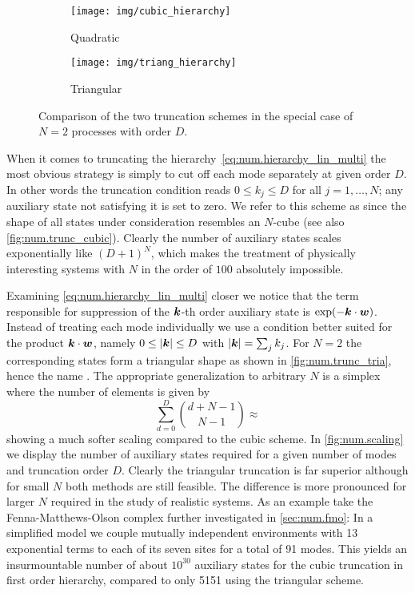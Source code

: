 \begin{figure}
  \centering
  \begin{subfigure}[b]{.4\columnwidth}
    \centering
    \texttt{[image: img/cubic\_hierarchy]}
    \caption{Quadratic}
    \label{fig:num.trunc_cubic}
  \end{subfigure}
  \begin{subfigure}[b]{.4\columnwidth}
    \centering
    \texttt{[image: img/triang\_hierarchy]}
    \caption{Triangular}
    \label{fig:num.trunc_tria}
  \end{subfigure}
  \caption{Comparison of the two truncation schemes in the special case of $N=2$ processes with order $D$.}
  \label{fig:num.trunc}
\end{figure}
When it comes to truncating the hierarchy~\ref{eq:num.hierarchy_lin_multi} the most obvious strategy is simply to cut off each mode separately at given order $D$.
In other words the truncation condition reads $0 \le k_j \le D$ for all $j=1,\dots,N$; any auxiliary state not satisfying it is set to zero.
We refer to this scheme as  since the shape of all states under consideration resembles an $N$-cube (see also \autoref{fig:num.trunc_cubic}).
Clearly the number of auxiliary states scales exponentially like $(D+1)^N$, which makes the treatment of physically interesting systems with $N$ in the order of $100$ absolutely impossible.

Examining \autoref{eq:num.hierarchy_lin_multi} closer we notice that the term responsible for suppression of the $\boldsymbol{k}$-th order auxiliary state is $\exp(-\kk \cdot \ww)$.
Instead of treating each mode individually we use a condition better suited for the product $\boldsymbol{k}\cdot\boldsymbol{w}$, namely $0 \le \left\vert \boldsymbol{k} \right\vert \le D$ with $\left\vert \boldsymbol{k} \right\vert = \sum_j k_j$.
For $N=2$ the corresponding states form a triangular shape as shown in \autoref{fig:num.trunc_tria}, hence the name .
The appropriate generalization to arbitrary $N$ is a simplex where the number of elements is given by
\begin{equation*}
  \sum_{d=0}^D {d + N - 1 \choose N - 1} \approx %
\end{equation*}
showing a much softer scaling compared to the cubic scheme.
In \autoref{fig:num.scaling} we display the number of auxiliary states required for a given number of modes and truncation order $D$.
Clearly the triangular truncation is far superior although for small $N$ both methods are still feasible.
The difference is more pronounced for larger $N$ required in the study of realistic systems.
As an example take the Fenna-Matthews-Olson complex further investigated in \autoref{sec:num.fmo}:
In a simplified model we couple mutually independent environments with 13 exponential terms to each of its seven sites for a total of 91 modes.
This yields an insurmountable number of about $10^{30}$ auxiliary states for the cubic truncation in first order hierarchy, compared to only 5151 using the triangular scheme.


